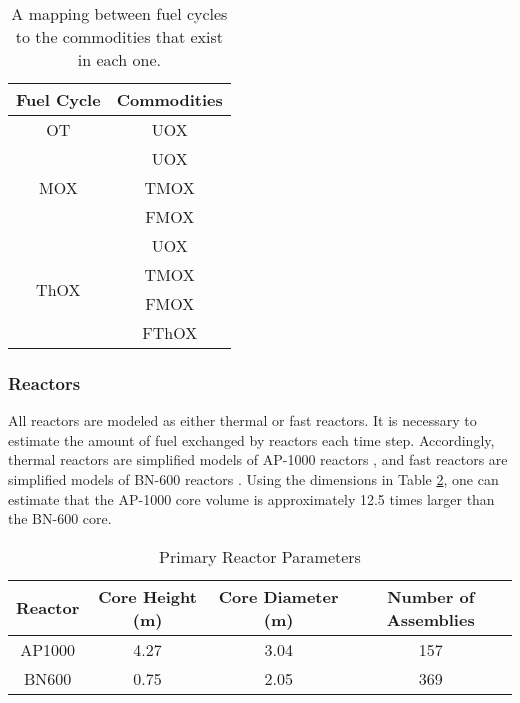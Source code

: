 \begin{table}[h!]
\centering
\caption{A mapping between fuel cycles to the commodities that exist in each one.}
\label{tbl:fc_to_commods}
\begin{tabular}{|c|c|}
\hline
\textbf{Fuel Cycle}            & \textbf{Commodities} \\ \hline
OT                    & UOX         \\ \hline
\multirow{3}{*}{MOX}  & UOX         \\  
                      & TMOX        \\  
                      & FMOX        \\ \hline
\multirow{4}{*}{ThOX} & UOX         \\  
                      & TMOX        \\  
                      & FMOX        \\  
                      & FThOX       \\ \hline
\end{tabular}
\end{table}

\subsubsection{Reactors}

All reactors are modeled as either thermal or fast reactors. It is necessary to
estimate the amount of fuel exchanged by reactors each time step. Accordingly,
thermal reactors are simplified models of AP-1000 reactors \cite{ARIS}, and fast
reactors are simplified models of BN-600 reactors
\cite{reactors2007experience}. Using the dimensions in Table
\ref{tbl:rx_params}, one can estimate that the AP-1000 core volume is
approximately 12.5 times larger than the BN-600 core.

\begin{table}[h!]
\centering
\caption{Primary Reactor Parameters}
\label{tbl:rx_params}
\begin{tabular}{|c|c|c|c|}
\hline
\textbf{Reactor} & \textbf{Core Height (m)} & \textbf{Core Diameter (m)}
& \textbf{Number of Assemblies} \\ \hline
AP1000  & 4.27            & 3.04              & 157 \\ \hline
BN600   & 0.75            & 2.05              & 369 \\ \hline
\end{tabular}
\end{table}

